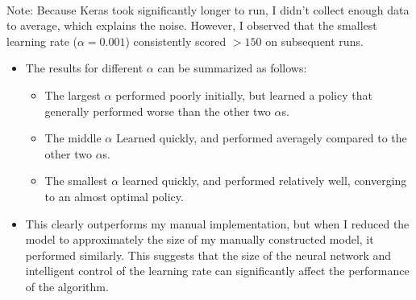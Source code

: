 \documentclass[a4paper]{article}
\begin{document}
\begin{centering}
    \scalebox{0.6}{} \\
\end{centering}
Note: Because Keras took significantly longer to run, I didn't collect enough
data to average, which explains the noise. However, I observed that the
smallest learning rate ($\alpha = 0.001$) consistently scored $> 150$ on
subsequent runs.
\begin{itemize}
    \item The results for different $\alpha$ can be summarized as follows:
    \begin{itemize}
        \item The largest $\alpha$ performed poorly initially, but learned a
            policy that generally performed worse than the other two $\alpha$s.
        \item The middle $\alpha$ Learned quickly, and performed averagely
            compared to the other two $\alpha$s.
        \item The smallest $\alpha$ learned quickly, and performed relatively
            well, converging to an almost optimal policy.
    \end{itemize}
    \item This clearly outperforms my manual implementation, but when I
        reduced the model to approximately the size of my manually constructed
        model, it performed similarly. This suggests that the size of the
        neural network and intelligent control of the learning rate can
        significantly affect the performance of the algorithm.
\end{itemize}
\end{document}
